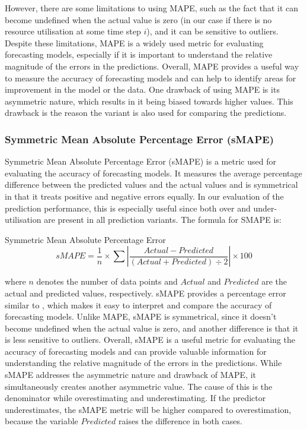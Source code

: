       However, there are some limitations to using MAPE, such as the fact that it can become undefined when the actual value is zero (in our case if there is no resource utilisation at some time step $i$), and it can be sensitive to outliers.
      Despite these limitations, MAPE is a widely used metric for evaluating forecasting models, especially if it is important to understand the relative magnitude of the errors in the predictions. 
      Overall, MAPE provides a useful way to measure the accuracy of forecasting models and can help to identify areas for improvement in the model or the data.
      One drawback of using MAPE is its asymmetric nature, which results in it being biased towards higher values.
      This drawback is the reason the variant  is also used for comparing the predictions.


    \subsubsection{Symmetric Mean Absolute Percentage Error (sMAPE)}
    \label{sec:smape-metrics-evaluation}
    
      Symmetric Mean Absolute Percentage Error (sMAPE) \cite{kreinovichHowEstimateForecasting2014} is a metric used for evaluating the accuracy of forecasting models. It measures the average percentage difference between the predicted values and the actual values and is symmetrical in that it treats positive and negative errors equally.
      In our evaluation of the prediction performance, this is especially useful since both over and under-utilisation are present in all prediction variants.
      The formula for SMAPE is:

      \begin{pabox}{Symmetric Mean Absolute Percentage Error}
        $$sMAPE = \frac{1}{n} \times \sum \left|\frac{Actual - Predicted}{\left(Actual + Predicted\right) \div 2}\right| \times 100$$
      \end{pabox}
      where $n$ denotes the number of data points and $Actual$ and $Predicted$ are the actual and predicted values, respectively.
      sMAPE provides a percentage error similar to , which makes it easy to interpret and compare the accuracy of forecasting models. Unlike MAPE, sMAPE is symmetrical, since it doesn't become undefined when the actual value is zero, and another difference is that it is less sensitive to outliers.
      Overall, sMAPE is a useful metric for evaluating the accuracy of forecasting models and can provide valuable information for understanding the relative magnitude of the errors in the predictions.
      While sMAPE addresses the asymmetric nature and drawback of MAPE, it simultaneously creates another asymmetric value.
      The cause of this is the denominator while overestimating and underestimating.
      If the predictor underestimates, the sMAPE metric will be higher compared to overestimation, because the variable $Predicted$ raises the difference in both cases.
      
